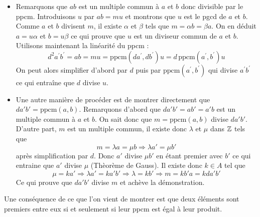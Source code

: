 \begin{demo}
 \begin{itemize}
 \item Remarquons que $ab$ est un multiple commun à $a$ et $b$ donc divisible par le ppcm. Introduisons $u$ par $ab=mu$ et montrons que $u$ est le pgcd de $a$ et $b$.\newline
Comme $a$ et $b$ divisent $m$, il existe $\alpha$ et $\beta$ tels que $m=\alpha b = \beta a$. On en déduit $a=u \alpha$ et $b=u \beta$ ce qui prouve que $u$ est un diviseur commun de $a$ et $b$.\newline
Utilisons maintenant la linéarité du ppcm :
\begin{displaymath}
 d^2 a^\prime b^\prime = ab=mu=\text{ppcm}(da^\prime,db^\prime)u=d\,\text{ppcm}(a^\prime,b^\prime)u
\end{displaymath}
On peut alors simplifier d'abord par $d$ puis par $\text{ppcm}(a^\prime,b^\prime)$ qui divise $a^\prime b^\prime$ ce qui entraîne que $d$ divise $u$.
\item Une autre manière de procéder est de montrer directement que $da'b'=\text{ppcm}(a,b)$.\newline
Remarquons d'abord que $da'b'=ab'=a'b$ est un multiple commun à $a$ et $b$. On sait donc que $m=\text{ppcm}(a,b)$ divise $da'b'$.\newline
D'autre part, $m$ est un multiple commun, il existe donc $\lambda$ et $\mu$ dans $\mathbb{Z}$ tels que 
\begin{displaymath}
m=\lambda a = \mu b \Rightarrow \lambda a' = \mu b' 
\end{displaymath}
après simplification par $d$. Donc $a'$ divise $\mu b'$ en étant premier avec $b'$ ce qui entraine que $a'$ divise $\mu$ (Thèorème de Gauss). Il existe donc $k\in A$ tel que
\begin{displaymath}
 \mu = k a' \Rightarrow  \lambda a' =  k a'b' \Rightarrow \lambda = kb' 
\Rightarrow m = k b' a = k da' b'
\end{displaymath}
Ce qui prouve que $da'b'$ divise $m$ et achève la démonstration.
\end{itemize}
\end{demo}
Une conséquence de ce que l'on vient de montrer est que deux éléments sont premiers entre eux si et seulement si leur ppcm est égal à leur produit.

